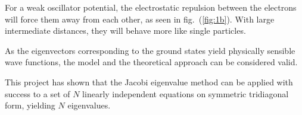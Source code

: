 \documentclass[a4paper,11pt]{article}
\begin{document}
For a weak oscillator potential, the electrostatic repulsion between the electrons will force them away from each other, as seen in fig.~(\ref{fig:1b}). With large intermediate distances, they will behave more like single particles.

As the eigenvectors corresponding to the ground states yield physically sensible wave functions, the model and the theoretical approach can be considered valid. 

This project has shown that the Jacobi eigenvalue method can be applied with success to a set of $N$ linearly independent equations on symmetric tridiagonal form, yielding $N$ eigenvalues. 




\end{document}
